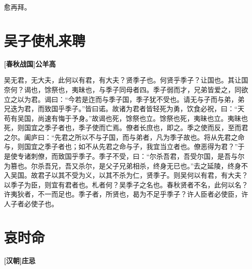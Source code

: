 \documentclass[UTF8,titlepage,oneside]{ctexbook}
\begin{document}
愈再拜。


\chapter*{吴子使札来聘}
\begin{center}
	\textbf{[春秋战国]公羊高}
\end{center}

吴无君，无大夫，此何以有君，有大夫？贤季子也。何贤乎季子？让国也。其让国奈何？谒也，馀祭也，夷昧也，与季子同母者四。季子弱而才，兄弟皆爱之，同欲立之以为君。谒曰：“今若是迮而与季子国，季子犹不受也。请无与子而与弟，弟兄迭为君，而致国乎季子。”皆曰诺。故诸为君者皆轻死为勇，饮食必祝，曰：“天苟有吴国，尚速有悔于予身。”故谒也死，馀祭也立。馀祭也死，夷昧也立。夷昧也死，则国宜之季子者也，季子使而亡焉。僚者长庶也，即之。季之使而反，至而君之尔。阖庐曰：“先君之所以不与子国，而与弟者，凡为季子故也。将从先君之命与，则国宜之季子者也；如不从先君之命与子，我宜当立者也。僚恶得为君？”于是使专诸刺僚，而致国乎季子。季子不受，曰：“尔杀吾君，吾受尔国，是吾与尔为篡也。尔杀吾兄，吾又杀尔，是父子兄弟相杀，终身无已也。”去之延陵，终身不入吴国。故君子以其不受为义，以其不杀为仁，贤季子。则吴何以有君，有大夫？以季子为臣，则宜有君者也。札者何？吴季子之名也。春秋贤者不名，此何以名？许夷狄者，不一而足也。季子者，所贤也，曷为不足乎季子？许人臣者必使臣，许人子者必使子也。


\chapter*{哀时命}
\begin{center}
	\textbf{[汉朝]庄忌}
\end{center}
\end{document}
